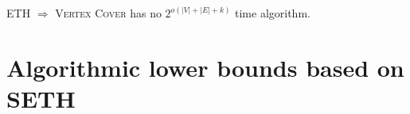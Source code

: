 \begin{frame}

 \begin{theorem}
	ETH $\Rightarrow$ \textsc{Vertex Cover} has no $2^{o(|V|+|E|+k)}$ time algorithm.
 \end{theorem}

\end{frame}

\section{Algorithmic lower bounds based on SETH}

